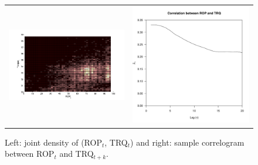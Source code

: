 \begin{figure}[ht!]
\begin{center}
\begin{tabular}{c@{}c}
\includegraphics[scale=0.25]{./figures/VT_TRQ_ROP_density} &

\includegraphics[scale=0.32]{./figures/Verdande_Corr_TRQ_vs_ROP.pdf}  \\
\end{tabular}
\caption{\label{Figure:VTTorqueRateOfPenetration} Left: joint density of (ROP$_t$, TRQ$_t$) and right: sample correlogram between ROP$_t$ and TRQ$_{t+k}$. }
\end{center}
\end{figure}

